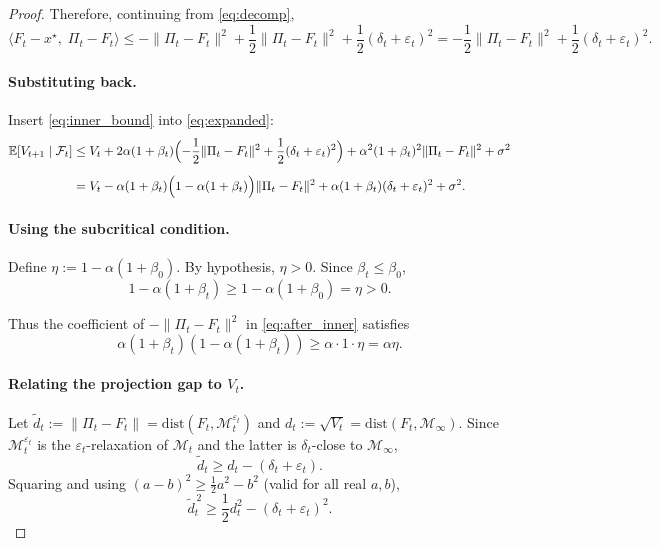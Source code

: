 \documentclass[11pt]{article}
\begin{document}
\begin{proof}
Therefore, continuing from \eqref{eq:decomp},
\begin{equation}\label{eq:inner_bound}
\langle F_t - x^\star,\; \Pi_t - F_t \rangle
\le -\|\Pi_t - F_t\|^2
   + \frac12\|\Pi_t - F_t\|^2
   + \frac12(\delta_t + \varepsilon_t)^2
= -\frac12\|\Pi_t - F_t\|^2
   + \frac12(\delta_t + \varepsilon_t)^2 .
\end{equation}

\paragraph{Substituting back.}
Insert \eqref{eq:inner_bound} into \eqref{eq:expanded}:
\begin{align}
\mathbb{E}[V_{t+1} \mid \mathcal{F}_t]
&\le V_t
   + 2\alpha(1+\beta_t)\Bigl(-\frac12\|\Pi_t - F_t\|^2 + \frac12(\delta_t + \varepsilon_t)^2\Bigr)
   + \alpha^2(1+\beta_t)^2 \|\Pi_t - F_t\|^2
   + \sigma^2 \notag\\[2mm]
&= V_t
   - \alpha(1+\beta_t)\Bigl(1 - \alpha(1+\beta_t)\Bigr)\|\Pi_t - F_t\|^2
   + \alpha(1+\beta_t)(\delta_t + \varepsilon_t)^2
   + \sigma^2 . \label{eq:after_inner}
\end{align}

\paragraph{Using the subcritical condition.}
Define \(\eta := 1 - \alpha(1+\beta_0)\). By hypothesis, \(\eta > 0\). Since \(\beta_t \le \beta_0\),
\[
1 - \alpha(1+\beta_t) \ge 1 - \alpha(1+\beta_0) = \eta > 0 .
\]

Thus the coefficient of \(-\|\Pi_t - F_t\|^2\) in \eqref{eq:after_inner} satisfies
\[
\alpha(1+\beta_t)(1 - \alpha(1+\beta_t)) \ge \alpha \cdot 1 \cdot \eta = \alpha\eta .
\]

\paragraph{Relating the projection gap to \(V_t\).}
Let \(\tilde d_t := \|\Pi_t - F_t\| = \mathrm{dist}(F_t,\mathcal{M}_t^{\varepsilon_t})\) and \(d_t := \sqrt{V_t} = \mathrm{dist}(F_t,\mathcal{M}_\infty)\).
Since \(\mathcal{M}_t^{\varepsilon_t}\) is the \(\varepsilon_t\)-relaxation of \(\mathcal{M}_t\) and the latter is \(\delta_t\)-close to \(\mathcal{M}_\infty\),
\[
\tilde d_t \ge d_t - (\delta_t + \varepsilon_t) .
\]
Squaring and using \((a-b)^2 \ge \frac12 a^2 - b^2\) (valid for all real \(a,b\)),
\[
\tilde d_t^{\,2} \ge \frac12 d_t^2 - (\delta_t + \varepsilon_t)^2 .
\]


\end{proof}
\end{document}
